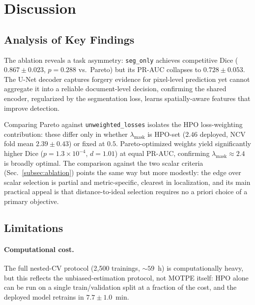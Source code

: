 \documentclass[final,5p,times,twocolumn,number]{elsarticle}
\newcommand{\rev}[1]{#1}
\newcommand{\revB}[1]{#1}
\begin{document}

\section{Discussion}
\label{sec:discussion}

\subsection{Analysis of Key Findings}

The ablation reveals a task asymmetry: \texttt{seg\_only} achieves competitive
Dice ($0.867 \pm 0.023$, $p = 0.288$ vs.\ Pareto) but its PR-AUC collapses to
$0.728 \pm 0.053$. The U-Net decoder captures forgery evidence for pixel-level
prediction yet cannot aggregate it into a reliable document-level decision,
confirming the shared encoder, regularized by the segmentation loss, learns
spatially-aware features that improve detection.

Comparing Pareto against \texttt{unweighted\_losses} isolates the HPO
loss-weighting contribution: these differ only in whether $\lambda_{\text{mask}}$
is HPO-set \rev{($2.46$ deployed, NCV fold mean $2.39 \pm 0.43$)} or fixed at
$0.5$. Pareto-optimized weights yield significantly higher Dice ($p =
1.3 \times 10^{-4}$, $d = 1.01$) at equal PR-AUC, confirming
$\lambda_{\text{mask}} \approx 2.4$ is broadly optimal. \revB{The comparison against the two scalar criteria
(Sec.~\ref{subsec:ablation}) points the same way but more modestly: the edge over
scalar selection is partial and metric-specific, clearest in localization, and its
main practical appeal is that distance-to-ideal selection requires no a priori
choice of a primary objective.}

\subsection{Limitations}

\paragraph{\rev{Computational cost.}}
\rev{The full nested-CV protocol (2{,}500 trainings, ${\sim}59$~h) is computationally
heavy, but this reflects the unbiased-estimation protocol, not MOTPE itself:
HPO alone can be run on a single train/validation split at a fraction of the
cost, and the deployed model retrains in $7.7 \pm 1.0$~min.}
\end{document}
